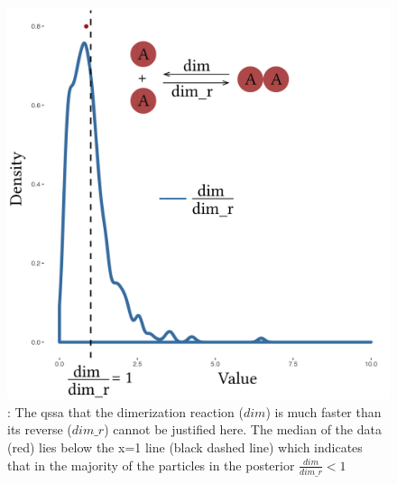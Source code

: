 \begin{figure}[htbp]
\begin{center}
\includegraphics[scale=0.4]{../../chapters/chapterStabilityFinder/images/MA_QSSA.png}
\caption[LoF caption]{ \label{fig:ma_qssa}: The \acrshort{qssa} that the dimerization reaction ($dim$) is much faster than its reverse ($dim\_r$) cannot be justified here. The median of the data (red) lies below the x=1 line (black dashed line) which indicates that in the majority of the particles in the posterior $\frac{dim}{dim\_r} < 1$}
\end{center}
\end{figure}
\clearpage




